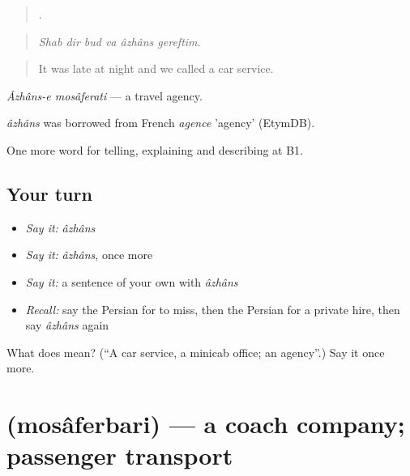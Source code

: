 \begin{quote}
     .
\end{quote}

\begin{quote}
\emph{Shab dir bud va âzhâns gereftim.}
\end{quote}

\begin{quote}
It was late at night and we called a car service.
\end{quote}

\emph{Âzhâns-e mosâferati} — a travel agency.

\begin{cousinweb}
\emph{âzhâns} was borrowed from French \emph{agence} 'agency' (EtymDB).
\end{cousinweb}

\begin{grammarlens}[title={What you've built}]
One more word for telling, explaining and describing at B1.
\end{grammarlens}

\subsection*{Your turn}
\begin{itemize}
\raggedright
  \item \emph{Say it:} \emph{âzhâns}
  \item \emph{Say it:} \emph{âzhâns}, once more
  \item \emph{Say it:} a sentence of your own with \emph{âzhâns}
  \item \emph{Recall:} say the Persian for to miss, then the Persian for a private hire, then say \emph{âzhâns} again
\end{itemize}

\begin{tcolorbox}[breakable,colback=teal!4,colframe=teal!35!black,title={Before you move on}]
What does  mean? (\textquotedblleft{}A car service, a minicab office; an agency\textquotedblright{}.) Say it once more.
\end{tcolorbox}
\section[\texorpdfstring{\fa{مسافربری} (mosâferbari)}{مسافربری (mosâferbari)}]{ (mosâferbari) — a coach company; passenger transport}

\label{lesson:FA-C435-mosaferbari}



